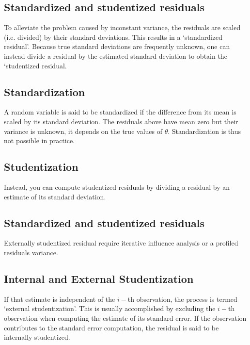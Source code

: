 \documentclass[12pt, a4paper]{report}
\theoremstyle{plain}
\theoremstyle{definition}
\theoremstyle{remark}
\begin{document}

\subsection{Standardized and studentized residuals} %

To alleviate the problem caused by inconstant variance, the residuals are scaled (i.e. divided) by their standard deviations. This results in a `standardized residual'. Because true standard deviations are frequently unknown, one can instead divide a residual by the estimated standard deviation to obtain the `studentized residual. 




\subsection{Standardization} %

A random variable is said to be standardized if the difference from its mean is scaled by its standard deviation. The residuals above have mean zero but their variance is unknown, it depends on the true values of $\theta$. Standardization is thus not possible in practice.

\subsection{Studentization} %
Instead, you can compute studentized residuals by dividing a residual by an estimate of its standard deviation. 


\subsection{Standardized and studentized residuals} %

Externally  studentized residual require iterative influence analysis or a profiled residuals variance.


\subsection{Internal and External Studentization} %
If that estimate is independent of the $i-$th observation, the process is termed `external studentization'. This is usually accomplished by excluding the $i-$th observation when computing the estimate of its standard error. If the observation contributes to the
standard error computation, the residual is said to be internally studentized.
\end{document}
